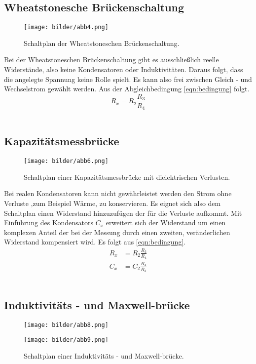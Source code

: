\subsection{Wheatstonesche Brückenschaltung}
\begin{figure}
    \centering
    \texttt{[image: bilder/abb4.png]}
    \caption{Schaltplan der Wheatstoneschen Brückenschaltung. \cite{skript}} 
    \label{fig:abb4}
\end{figure}
Bei der Wheatstoneschen Brückenschaltung gibt es ausschließlich reelle Widerstände, also  keine Kondensatoren
oder Induktivitäten. Daraus folgt, dass die angelegte Spannung keine Rolle spielt. Es kann also frei zwischen
Gleich - und Wechselstrom gewählt werden. Aus der Abgleichbedingung \eqref{eqn:bedingung} folgt.
\begin{equation}
    \label{eqn:what}
    R_x = R_2 \frac{R_3}{R_4}
\end{equation}
\\
\newline
\subsection{Kapazitätsmessbrücke}
\begin{figure}
    \centering
    \texttt{[image: bilder/abb6.png]}
    \caption{Schaltplan einer Kapazitätsmessbrücke mit dielektrischen Verlusten. \cite{skript}} 
    \label{fig:abb6}
\end{figure}
Bei realen Kondensatoren kann nicht gewährleistet werden den Strom ohne Verluste ,zum Beispiel Wärme, 
zu konservieren. Es eignet sich also dem Schaltplan einen Widerstand hinzuzufügen der für die Verluste aufkommt.
Mit Einführung des Kondensators $C_x$ erweitert sich der Widerstand um einen komplexen Anteil der bei der Messung durch 
einen zweiten, veränderlichen Widerstand kompensiert wird. 
Es folgt aus \eqref{eqn:bedingung}.
\begin{align}
    \label{eqn:wombocombo}
    R_x &= R_2\frac{R_3}{R_4} \\
    C_x &= C_2\frac{R_4}{R_3}
\end{align}
\\
\newline
\subsection{Induktivitäts - und Maxwell-brücke }

\begin{figure}
\begin{minipage}[c]{0.5\textwidth}
    \centering
    \texttt{[image: bilder/abb8.png]}
    \label{fig:abb8}
\end{minipage}    
\begin{minipage}[c]{0.5\textwidth}
            \centering
        \texttt{[image: bilder/abb9.png]}
        \label{fig:abb9}
\end{minipage}
\caption{Schaltplan einer Induktivitäts - und Maxwell-brücke. \cite{skript}}
\label{??}
\end{figure}


